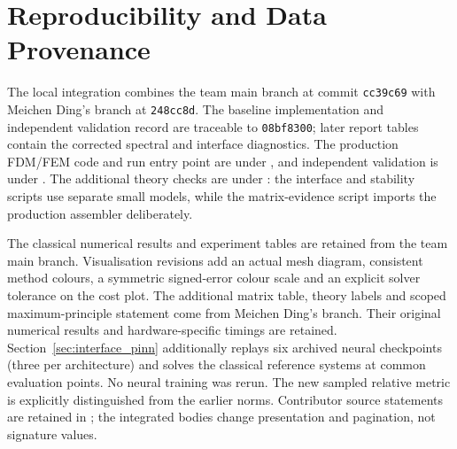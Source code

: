 \documentclass[11pt,a4paper]{article}
\theoremstyle{definition}
\theoremstyle{remark}
\begin{document}
\section{Reproducibility and Data Provenance}
\begin{sloppypar}
The local integration combines the team main branch at commit
\texttt{cc39c69} with Meichen Ding's branch at \texttt{248cc8d}.
The baseline implementation and independent validation record are traceable
to \texttt{08bf8300}; later report tables contain the corrected spectral and
interface diagnostics. The production FDM/FEM code and run entry point are
under , and independent validation is under
. The additional theory checks are under
: the interface and stability
scripts use separate small models, while the matrix-evidence script imports
the production assembler deliberately.

The classical numerical results and experiment tables are retained from
the team main branch. Visualisation revisions add an actual mesh diagram,
consistent method colours, a symmetric signed-error colour scale and
an explicit solver tolerance on the cost plot. The additional matrix table,
theory labels and scoped maximum-principle statement come from Meichen
Ding's branch. Their original numerical results and hardware-specific
timings are retained. Section~\ref{sec:interface_pinn} additionally replays
six archived neural checkpoints (three per architecture) and solves the classical reference
systems at common evaluation points. No neural training was rerun. The new
sampled relative metric is explicitly distinguished from the earlier norms. Contributor source statements are retained in
; the integrated bodies change presentation and pagination,
not signature values.
\end{sloppypar}

\clearpage

\end{document}
